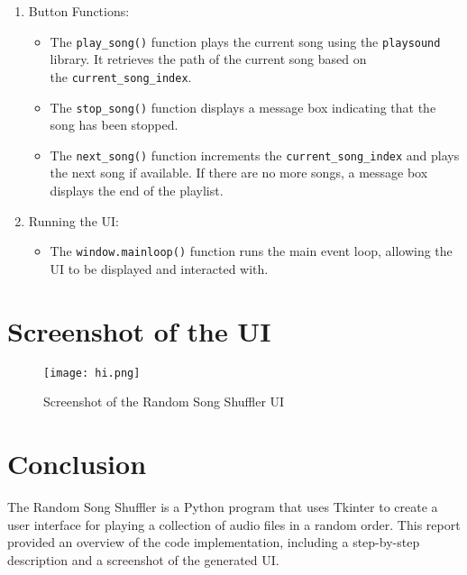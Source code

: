 \documentclass{article}
\begin{document}
\begin{enumerate}
  \item Button Functions:
    \begin{itemize}
    \item The \texttt{play\_song()} function plays the current song using the \texttt{playsound} library. It retrieves the path of the current song based on \\
      the \texttt{current\_song\_index}.
            \item The \texttt{stop\_song()} function displays a message box indicating that the song has been stopped.
      \item The \texttt{next\_song()} function increments the \texttt{current\_song\_index} and plays the next song if available. If there are no more songs, a message box displays the end of the playlist.
    \end{itemize}
  
  \item Running the UI:
    \begin{itemize}
      \item The \texttt{window.mainloop()} function runs the main event loop, allowing the UI to be displayed and interacted with.
    \end{itemize}
\end{enumerate}

\section{Screenshot of the UI}
\begin{figure}[htbp]
  \centering
  \texttt{[image: hi.png]}
  \caption{Screenshot of the Random Song Shuffler UI}
\end{figure}

\section{Conclusion}
The Random Song Shuffler is a Python program that uses Tkinter to create a user interface for playing a collection of audio files in a random order. This report provided an overview of the code implementation, including a step-by-step description and a screenshot of the generated UI.
\end{document}
